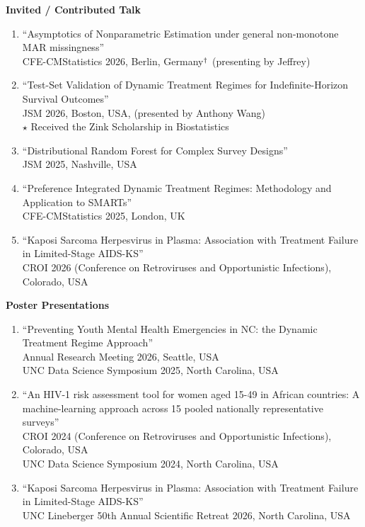 \documentclass[11pt]{scrartcl}
\begin{document}
\textbf{Invited / Contributed Talk}
\begin{enumerate}
  \item ``Asymptotics of Nonparametric Estimation under general non-monotone MAR missingness''\\
  CFE-CMStatistics 2026, Berlin, Germany$^\textsubscript{†}$ (presenting by Jeffrey)
  
  \item ``Test-Set Validation of Dynamic Treatment Regimes for Indefinite-Horizon Survival Outcomes''\\
  JSM 2026, Boston, USA, (presented by Anthony Wang)\\
  $\star$ Received the Zink Scholarship in Biostatistics
  
  \item ``Distributional Random Forest for Complex Survey Designs'' \\
  JSM 2025, Nashville, USA
  
  \item ``Preference Integrated Dynamic Treatment Regimes: Methodology and Application to SMARTs''\\
  CFE-CMStatistics 2025, London, UK

  \item ``Kaposi Sarcoma Herpesvirus in Plasma: Association with Treatment Failure in Limited-Stage AIDS-KS''\\
  CROI 2026 (Conference on Retroviruses and Opportunistic Infections), Colorado, USA
\end{enumerate}


\textbf{Poster Presentations}
\begin{enumerate}
  \item ``Preventing Youth Mental Health Emergencies in NC: the Dynamic Treatment Regime Approach''\\
  Annual Research Meeting 2026, Seattle, USA\\
  UNC Data Science Symposium 2025, North Carolina, USA

  \item ``An HIV-1 risk assessment tool for women aged 15-49 in African countries: A machine-learning approach across 15 pooled nationally representative surveys''\\
  CROI 2024 (Conference on Retroviruses and Opportunistic Infections), Colorado, USA\\
  UNC Data Science Symposium 2024, North Carolina, USA

  \item ``Kaposi Sarcoma Herpesvirus in Plasma: Association with Treatment Failure in Limited-Stage AIDS-KS''\\
  UNC Lineberger 50th Annual Scientific Retreat 2026, North Carolina, USA

\end{enumerate}
\end{document}
